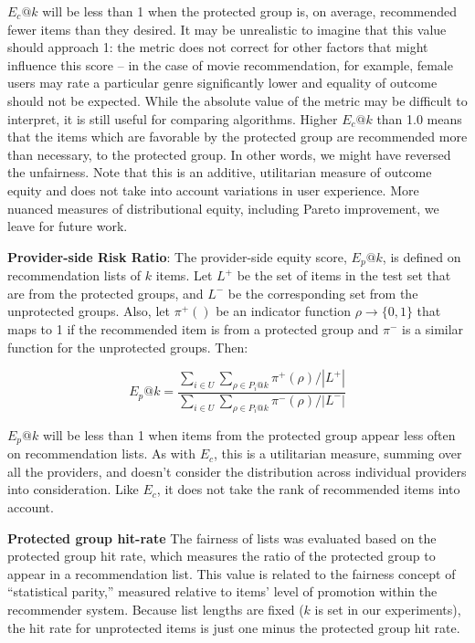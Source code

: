         
        $E_c@k$ will be less than 1 when the protected group is, on average, recommended fewer items than they desired. It may be unrealistic to imagine that this value should approach 1: the metric does not correct for other factors that might influence this score -- in the case of movie recommendation, for example, female users may rate a particular genre significantly lower and equality of outcome should not be expected.
        While the absolute value of the metric may be difficult to interpret, it is still useful for comparing algorithms. Higher $E_c@k$ than 1.0 means that the items which are favorable by the protected group are recommended more than necessary, to the protected group. In other words, we might have reversed the unfairness. Note that this is an additive, utilitarian measure of outcome equity and does not take into account variations in user experience. More nuanced measures of distributional equity, including Pareto improvement, we leave for future work.
        
        
        \textbf{Provider-side Risk Ratio}: The provider-side equity score, $E_p@k$, is defined on recommendation lists of $k$ items. Let $L^+$ be the set of items in the test set that are from the protected groups, and $L^-$ be the corresponding set from the unprotected groups. Also, let $\pi^+()$ be an indicator function $\rho \rightarrow \{0,1\}$ that maps to 1 if the recommended item is from a protected group and $\pi^-$ is a similar function for the unprotected groups. Then:

        \begin{equation}
        E_p@k=\frac{\sum_{i \in U}{\sum_{\rho \in P_i@k}{\pi^+(\rho)}}/|L^+|}
        {\sum_{i \in U}{\sum_{\rho \in P_i@k}{\pi^-(\rho)}}/|L^-|}
        \end{equation}
        
        $E_p@k$ will be less than 1 when items from the protected group appear less often on recommendation lists. As with $E_c$, this is a utilitarian measure, summing over all the providers, and doesn't consider the distribution across individual providers into consideration. Like $E_c$, it does not take the rank of recommended items into account.


        \textbf{Protected group hit-rate}
        The fairness of lists was evaluated based on the protected group hit rate, which measures the ratio of the protected group to appear in a recommendation list. This value is related to the fairness concept of ``statistical parity,'' measured relative to items' level of promotion within the recommender system. Because list lengths are fixed ($k$ is set in our experiments), the hit rate for unprotected items is just one minus the protected group hit rate. 
        
